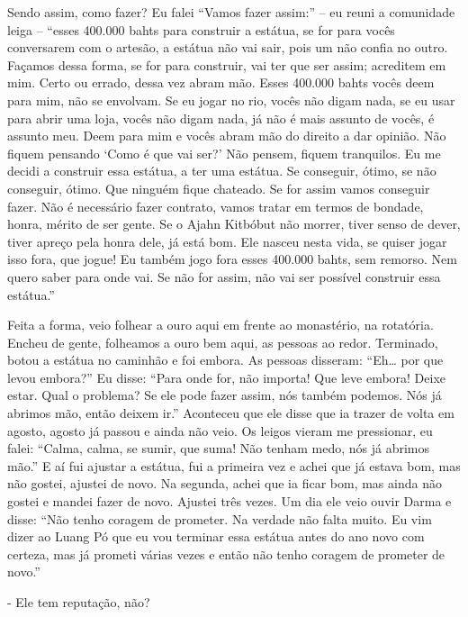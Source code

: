 Sendo assim, como fazer? Eu falei “Vamos fazer assim:” – eu reuni a
comunidade leiga – “esses 400.000 bahts para construir a estátua, se
for para vocês conversarem com o artesão, a estátua não vai sair, pois
um não confia no outro. Façamos dessa forma, se for para construir, vai
ter que ser assim; acreditem em mim. Certo ou errado, dessa vez abram
mão. Esses 400.000 bahts vocês deem para mim, não se envolvam. Se eu
jogar no rio, vocês não digam nada, se eu usar para abrir uma loja,
vocês não digam nada, já não é mais assunto de vocês, é assunto meu.
Deem para mim e vocês abram mão do direito a dar opinião. Não fiquem
pensando ‘Como é que vai ser?’ Não pensem, fiquem tranquilos. Eu me
decidi a construir essa estátua, a ter uma estátua. Se conseguir,
ótimo, se não conseguir, ótimo. Que ninguém fique chateado. Se for
assim vamos conseguir fazer. Não é necessário fazer contrato, vamos
tratar em termos de bondade, honra, mérito de ser gente. Se o Ajahn
Kitbóbut não morrer, tiver senso de dever, tiver apreço pela honra
dele, já está bom. Ele nasceu nesta vida, se quiser jogar isso fora,
que jogue! Eu também jogo fora esses 400.000 bahts, sem remorso. Nem
quero saber para onde vai. Se não for assim, não vai ser possível
construir essa estátua.”

Feita a forma, veio folhear a ouro aqui em frente ao monastério, na
rotatória. Encheu de gente, folheamos a ouro bem aqui, as pessoas ao
redor. Terminado, botou a estátua no caminhão e foi embora. As pessoas
disseram: “Eh… por que levou embora?” Eu disse: “Para onde for, não
importa! Que leve embora! Deixe estar. Qual o problema? Se ele pode
fazer assim, nós também podemos. Nós já abrimos mão, então deixem ir.”
Aconteceu que ele disse que ia trazer de volta em agosto, agosto já
passou e ainda não veio. Os leigos vieram me pressionar, eu falei:
“Calma, calma, se sumir, que suma! Não tenham medo, nós já abrimos
mão.” E aí fui ajustar a estátua, fui a primeira vez e achei que já
estava bom, mas não gostei, ajustei de novo. Na segunda, achei que ia
ficar bom, mas ainda não gostei e mandei fazer de novo. Ajustei três
vezes. Um dia ele veio ouvir Darma e disse: “Não tenho coragem de
prometer. Na verdade não falta muito. Eu vim dizer ao Luang Pó que eu
vou terminar essa estátua antes do ano novo com certeza, mas já prometi
várias vezes e então não tenho coragem de prometer de novo.”

{}- Ele tem reputação, não?

